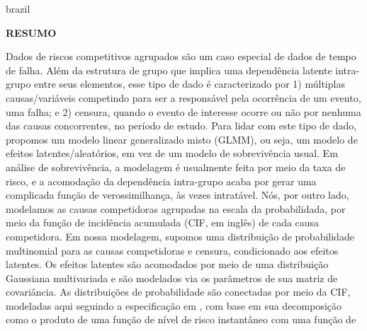 \documentclass[12pt, %
               openright, %
               oneside, %
               a4paper, %
               chapter=TITLE, %
               section=TITLE, %
               brazil,
               english %
]{abntex2}
\begin{document}
\newpage
\setlength{\absparsep}{18pt} %
\setlength{\abstitleskip}{1cm} %
\begin{resumo}[]
  \begin{otherlanguage*}{brazil}
    \vspace{-2cm}
    \begin{center}
      \bfseries{\large{\textsf{RESUMO}}}
    \end{center}
    \vspace{0.3cm}

    Dados de riscos competitivos agrupados s\~{a}o um caso especial de
    dados de tempo de falha. Al\'{e}m da estrutura de grupo que implica
    uma depend\^{e}ncia latente intra-grupo entre seus elementos, esse
    tipo de dado \'{e} caracterizado por 1) m\'{u}ltiplas
    causas/vari\'{a}veis ​​competindo para ser a respons\'{a}vel pela
    ocorr\^{e}ncia de um evento, uma falha; e 2) censura, quando o
    evento de interesse ocorre ou n\~{a}o por nenhuma das causas
    concorrentes, no per\'{i}odo de estudo. Para lidar com este tipo de
    dado, propomos um modelo linear generalizado misto (GLMM), ou seja,
    um modelo de efeitos latentes/aleat\'{o}rios, em vez de um modelo de
    sobreviv\^{e}ncia usual. Em an\'{a}lise de sobreviv\^{e}ncia, a
    modelagem \'{e} usualmente feita por meio da taxa de risco, e a
    acomodação da depend\^{e}ncia intra-grupo acaba por gerar uma
    complicada fun\c{c}\~{a}o de verossimilhan\c{c}a, \`{a}s vezes
    intrat\'{a}vel. N\'{o}s, por outro lado, modelamos as causas
    competidoras agrupadas na escala da probabilidada, por meio da
    fun\c{c}\~{a}o de incid\^{e}ncia acumulada (CIF, em ingl\^{e}s) de
    cada causa competidora. Em nossa modelagem, supomos uma
    distribui\c{c}\~{a}o de probabilidade multinomial para as causas
    competidoras e censura, condicionado aos efeitos latentes. Os
    efeitos latentes são acomodados por meio de uma distribui\c{c}\~{a}o
    Gaussiana multivariada e s\~{a}o modelados via os par\^{a}metros de
    sua matriz de covari\^{a}ncia. As distribui\c{c}\~{o}es de
    probabilidade s\~{a}o conectadas por meio da CIF, modeladas aqui
    seguindo a especifica\c{c}\~{a}o em , com base
    em sua decomposi\c{c}\~{a}o como o produto de uma fun\c{c}\~{a}o de
    n\'{i}vel de risco instant\^{a}neo com uma fun\c{c}\~{a}o de

\end{otherlanguage*}
\end{resumo}
\end{document}
